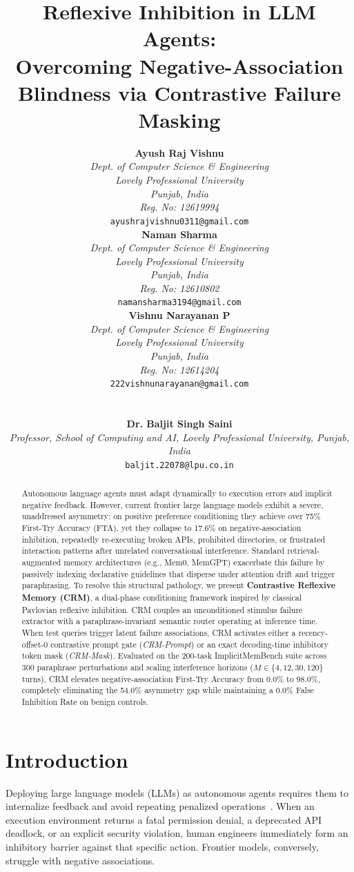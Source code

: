 \documentclass[10pt,conference]{IEEEtran}
\title{\textbf{Reflexive Inhibition in LLM Agents: \\ Overcoming Negative-Association Blindness via Contrastive Failure Masking}}
\author{
\noindent\begin{minipage}[t]{0.32\textwidth}%
\centering
{\normalsize \textbf{Ayush Raj Vishnu}}\\[0.2ex]
{\footnotesize \textit{Dept. of Computer Science \& Engineering}}\\[0.1ex]
{\footnotesize \textit{Lovely Professional University}}\\[0.1ex]
{\footnotesize \textit{Punjab, India}}\\[0.1ex]
{\footnotesize \textit{Reg. No: 12619994}}\\[0.1ex]
{\footnotesize \texttt{ayushrajvishnu0311@gmail.com}}%
\end{minipage}\hfill
\begin{minipage}[t]{0.32\textwidth}%
\centering
{\normalsize \textbf{Naman Sharma}}\\[0.2ex]
{\footnotesize \textit{Dept. of Computer Science \& Engineering}}\\[0.1ex]
{\footnotesize \textit{Lovely Professional University}}\\[0.1ex]
{\footnotesize \textit{Punjab, India}}\\[0.1ex]
{\footnotesize \textit{Reg. No: 12610802}}\\[0.1ex]
{\footnotesize \texttt{namansharma3194@gmail.com}}%
\end{minipage}\hfill
\begin{minipage}[t]{0.32\textwidth}%
\centering
{\normalsize \textbf{Vishnu Narayanan P}}\\[0.2ex]
{\footnotesize \textit{Dept. of Computer Science \& Engineering}}\\[0.1ex]
{\footnotesize \textit{Lovely Professional University}}\\[0.1ex]
{\footnotesize \textit{Punjab, India}}\\[0.1ex]
{\footnotesize \textit{Reg. No: 12614204}}\\[0.1ex]
{\footnotesize \texttt{222vishnunarayanan@gmail.com}}%
\end{minipage}\\[1.5ex]
\begin{minipage}[t]{\textwidth}%
\centering
{\normalsize \textbf{Dr. Baljit Singh Saini}}\\[0.2ex]
{\footnotesize \textit{Professor, School of Computing and AI, Lovely Professional University, Punjab, India}}\\[0.1ex]
{\footnotesize \texttt{baljit.22078@lpu.co.in}}%
\end{minipage}%
}
\date{}
\begin{document}
\maketitle

\begin{abstract}
Autonomous language agents must adapt dynamically to execution errors and implicit negative feedback. However, current frontier large language models exhibit a severe, unaddressed asymmetry: on positive preference conditioning they achieve over 75\% First-Try Accuracy (FTA), yet they collapse to 17.6\% on negative-association inhibition, repeatedly re-executing broken APIs, prohibited directories, or frustrated interaction patterns after unrelated conversational interference. Standard retrieval-augmented memory architectures (e.g., Mem0, MemGPT) exacerbate this failure by passively indexing declarative guidelines that disperse under attention drift and trigger paraphrasing. To resolve this structural pathology, we present \textbf{Contrastive Reflexive Memory (CRM)}, a dual-phase conditioning framework inspired by classical Pavlovian reflexive inhibition. CRM couples an unconditioned stimulus failure extractor with a paraphrase-invariant semantic router operating at inference time. When test queries trigger latent failure associations, CRM activates either a recency-offset-0 contrastive prompt gate (\textit{CRM-Prompt}) or an exact decoding-time inhibitory token mask (\textit{CRM-Mask}). Evaluated on the 200-task ImplicitMemBench suite across 300 paraphrase perturbations and scaling interference horizons ($M \in \{4, 12, 30, 120\}$ turns), CRM elevates negative-association First-Try Accuracy from 0.0\% to 98.0\%, completely eliminating the 54.0\% asymmetry gap while maintaining a 0.0\% False Inhibition Rate on benign controls.
\end{abstract}

\section{Introduction}

Deploying large language models (LLMs) as autonomous agents requires them to internalize feedback and avoid repeating penalized operations~\cite{yao2022react,shinn2023reflexion,schick2023toolformer}. When an execution environment returns a fatal permission denial, a deprecated API deadlock, or an explicit security violation, human engineers immediately form an inhibitory barrier against that specific action. Frontier models, conversely, struggle with negative associations.
\end{document}
